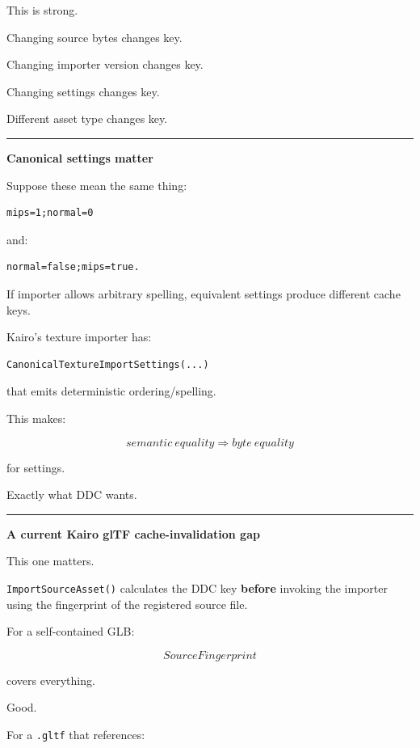 This is strong.

Changing source bytes changes key.

Changing importer version changes key.

Changing settings changes key.

Different asset type changes key.

\begin{center}\rule{0.5\linewidth}{0.5pt}\end{center}

\textbf{Canonical settings matter}

Suppose these mean the same thing:

\begin{verbatim}
mips=1;normal=0
\end{verbatim}

and:

\begin{verbatim}
normal=false;mips=true.
\end{verbatim}

If importer allows arbitrary spelling, equivalent settings produce different cache keys.

Kairo's texture importer has:

\begin{verbatim}
CanonicalTextureImportSettings(...)
\end{verbatim}

that emits deterministic ordering/spelling.

This makes:

\[
semantic\ equality
\Rightarrow
byte\ equality
\]

for settings.

Exactly what DDC wants.

\begin{center}\rule{0.5\linewidth}{0.5pt}\end{center}

\textbf{A current Kairo glTF cache-invalidation gap}

This one matters.

\texttt{ImportSourceAsset()} calculates the DDC key \textbf{before} invoking the importer using the fingerprint of the registered source file.

For a self-contained GLB:

\[
SourceFingerprint
\]

covers everything.

Good.

For a \texttt{.gltf} that references:

